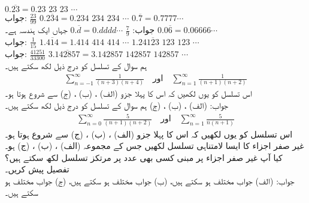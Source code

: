 $0.\overline{23}=0.23\,\,23\,\,23\,\,\cdots$\\
جواب:\quad
$\tfrac{23}{99}$
$0.\overline{234}=0.234\,\,234\,\,234\,\,\cdots$
$0.\overline{7}=0.7777\cdots$\\
جواب:\quad
$\tfrac{7}{9}$
$0.\overline{d}=0.dddd\cdots$\quad
جہاں  ایک ہندسہ ہے۔
$0.0\overline{6}=0.06666\cdots$\\
جواب:\quad
$\tfrac{1}{15}$
$1.\overline{414}=1.414\,\,414\,\,414\,\,\cdots$
$1.24\overline{123}\,\,123\,\,123\,\,\cdots$\\
جواب:\quad
$\tfrac{41251}{33300}$
$3.\overline{142857}=3.142857\,\,142857\,\,142857\,\,\cdots$
\\
ہم سوال  کے تسلسل کو درج ذیل لکھ سکتے ہیں۔
\begin{align*}
\sum_{n=-1}^{\infty}\frac{1}{(n+3)(n+4)}\quad \text{اور}\quad  \sum\limits_{n=1}^{\infty}\frac{1}{(n+1)(n+2)}
\end{align*}
اس تسلسل کو یوں لکھیں کہ اس کا پہلا جزو (الف) ، (ب) ، (ج)  سے شروع ہوتا ہو۔ \\
جواب:\quad
(الف) ، (ب) ،
 (ج) 
ہم سوال  کے تسلسل کو درج ذیل لکھ سکتے ہیں۔
\begin{align*}
\sum_{n=0}^{\infty}\frac{5}{(n+1)(n+2)}\quad\text{اور} \quad  \sum_{n=1}^{\infty}\frac{5}{n(n+1)}
\end{align*}
اس تسلسل کو یوں لکھیں کہ اس کا پہلا جزو (الف) ، (ب) ، (ج)  سے شروع ہوتا ہو۔
غیر صفر اجزاء کا ایسا لامتناہی تسلسل لکھیں جس کے مجموعہ (الف) ، (ب) ، (ج)  ہو۔ کیا آپ غیر صفر اجزاء پر مبنی کسی بھی عدد پر مرتکز تسلسل لکھ سکتے ہیں؟ تفصیل پیش کریں۔\\
جواب:\quad
(الف) جواب مختلف ہو سکتے ہیں، (ب) جواب مختلف ہو سکتے ہیں، (ج) جواب مختلف ہو سکتے ہیں۔
